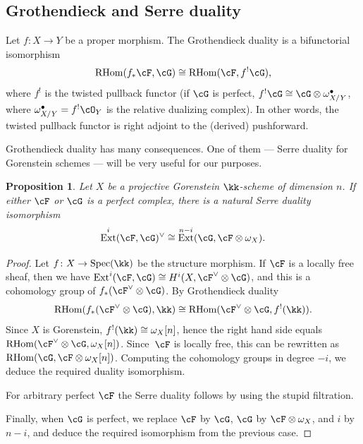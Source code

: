 \documentclass[11pt]{amsart}
\DeclareMathOperator{\Ext}{\mathrm{Ext}}
\DeclareMathOperator{\RHom}{\mathrm{RHom}}
\DeclareMathOperator{\Spec}{\mathrm{Spec}}
\theoremstyle{plain}
\newtheorem{proposition}[theorem]{Proposition}
\theoremstyle{definition}
\theoremstyle{remark}
\begin{document}
\subsection{Grothendieck and Serre duality}
\label{subsection:duality}

Let $f \colon X \to Y$ be a proper morphism. 
The {\sf Grothendieck duality} is a bifunctorial isomorphism
\begin{equation}\label{eq:Gd}
\RHom(f_*\cF,\cG) \cong \RHom(\cF,f^!\cG),
\end{equation}
where $f^!$ is the twisted pullback functor (if $\cG$ is perfect, $f^!\cG \cong \cG \otimes \omega^\bullet_{X/Y}$, where $\omega^\bullet_{X/Y} = f^!\cO_Y$ is the relative dualizing complex).
In other words, the twisted pullback functor is right adjoint to the (derived) pushforward.

Grothendieck duality has many consequences.
One of them --- Serre duality for Gorenstein schemes --- will be very useful for our purposes.

\begin{proposition}\label{proposition:serre-gorenstein}
Let $X$ be a projective Gorenstein $\kk$-scheme of dimension $n$.
If either $\cF$ or $\cG$ is a perfect complex, there is a natural Serre duality isomorphism
\begin{equation*}
\Ext^i(\cF,\cG)^\vee \cong \Ext^{n-i}(\cG,\cF \otimes \omega_X).
\end{equation*}
\end{proposition}
\begin{proof}
Let $f \colon X \to \Spec(\kk)$ be the structure morphism.
If $\cF$ is a locally free sheaf, then we have $\Ext^i(\cF,\cG) \cong H^i(X,\cF^\vee \otimes \cG)$, and this is a cohomology group of $f_*(\cF^\vee \otimes \cG)$.
By Grothendieck duality
\begin{equation*}
\RHom(f_*(\cF^\vee \otimes \cG),\kk) \cong \RHom(\cF^\vee \otimes \cG,f^!(\kk)).
\end{equation*}
Since $X$ is Gorenstein, $f^!(\kk) \cong \omega_X[n]$, hence the right hand side equals $\RHom(\cF^\vee \otimes \cG, \omega_X[n])$.
Since~$\cF$ is locally free, this can be rewritten as $\RHom(\cG,\cF \otimes \omega_X[n])$.
Computing the cohomology groups in degree $-i$, we deduce the required duality isomorphism.

For arbitrary perfect $\cF$ the Serre duality follows by using the stupid filtration.

Finally, when $\cG$ is perfect, we replace $\cF$ by $\cG$, $\cG$ by $\cF \otimes \omega_X$, and $i$ by $n - i$, and deduce the required isomorphism from the previous case.
\end{proof}
\end{document}
